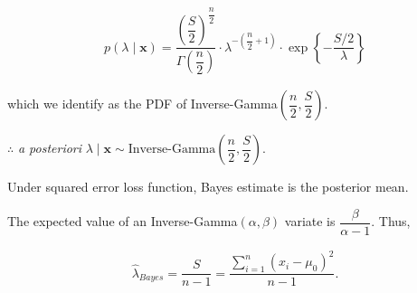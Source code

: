 \documentclass[12pt, a4paper]{article}
\begin{document}
\begin{align*}
p(\lambda \mid \mathbf{x}) = \dfrac{\left(\dfrac{S}{2}\right)^{\dfrac{n}{2}}}{\Gamma\left(\dfrac{n}{2}\right)} \cdot \lambda^{-\left(\dfrac{n}{2} + 1\right)} \cdot \exp\left\{- \dfrac{S/2}{\lambda} \right\}
\end{align*}

which we identify as the PDF of Inverse-Gamma$\left(\dfrac{n}{2}, \dfrac{S}{2} \right)$.

\vspace{0.5cm}

$\therefore$ \textit{a posteriori} $\lambda \mid \mathbf{x} \sim \text{Inverse-Gamma}\left(\dfrac{n}{2}, \dfrac{S}{2} \right)$.

\vspace{0.5cm}

{\fontsize{12}{20} \gloriahallelujahfont Under squared error loss function, Bayes estimate is the posterior mean.}

\vspace{0.2cm}

The expected value of an Inverse-Gamma$(\alpha, \beta)$ variate is $\dfrac{\beta}{\alpha - 1}$. Thus,

\begin{align*}
\hat{\lambda}_{Bayes} = \dfrac{S}{n-1} = \dfrac{\sum \limits_{i = 1}^{n}(x_i-\mu_0)^2}{n-1}.
\end{align*}
\end{document}
